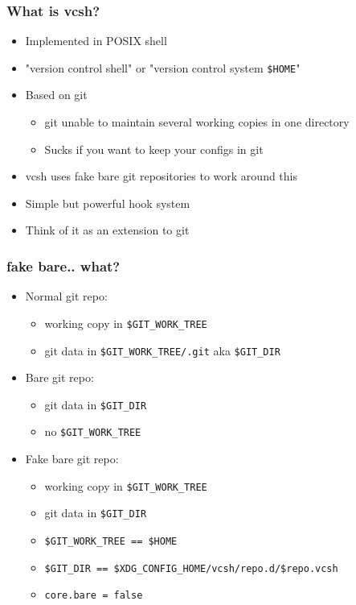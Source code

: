 \documentclass[t]{beamer}
\begin{document}
\begin{frame}
	\frametitle{What is vcsh?}
	\begin{itemize}
		\item Implemented in POSIX shell
		\item "version control shell" or "version control system \texttt{\$HOME}"
		\item Based on git
		\begin{itemize}
			\item git unable to maintain several working copies in one directory
			\item Sucks if you want to keep your configs in git
		\end{itemize}
		\item vcsh uses fake bare git repositories to work around this
		\item Simple but powerful hook system
		\item Think of it as an extension to git
	\end{itemize}
\end{frame}

\begin{frame}
	\frametitle{fake bare.. what?}
	\begin{itemize}
		\item Normal git repo:
		\begin{itemize}
			\item working copy in \texttt{\$GIT\_WORK\_TREE}
			\item git data in \texttt{\$GIT\_WORK\_TREE/.git} aka \texttt{\$GIT\_DIR}
		\end{itemize}
		\item Bare git repo:
		\begin{itemize}
			\item git data in \texttt{\$GIT\_DIR}
			\item no  \texttt{\$GIT\_WORK\_TREE}
		\end{itemize}
		\item Fake bare git repo:
		\begin{itemize}
			\item working copy in \texttt{\$GIT\_WORK\_TREE}
			\item git data in \texttt{\$GIT\_DIR}
			\item \texttt{\$GIT\_WORK\_TREE == \$HOME}
			\item \texttt{\$GIT\_DIR == \$XDG\_CONFIG\_HOME/vcsh/repo.d/\$repo.vcsh}
			\item \texttt{core.bare = false}
		\end{itemize}
	\end{itemize}
\end{frame}
\end{document}
